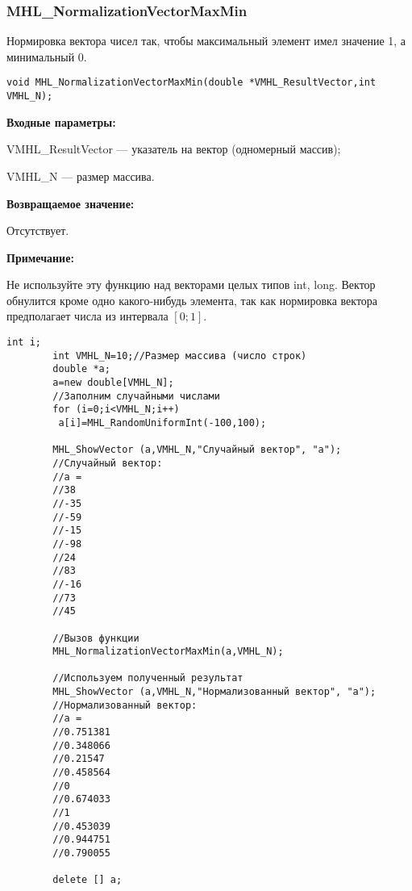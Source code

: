 \documentclass[a4paper,12pt]{article}
\begin{document}
\subsubsection{MHL\_NormalizationVectorMaxMin}\label{MHL_NormalizationVectorMaxMin}

Нормировка вектора чисел так, чтобы максимальный элемент имел значение 1, а минимальный 0.


\begin{lstlisting}[label=code_syntax_MHL_NormalizationVectorMaxMin,caption=Синтаксис]
void MHL_NormalizationVectorMaxMin(double *VMHL_ResultVector,int VMHL_N);
\end{lstlisting}

\textbf{Входные параметры:}

 VMHL\_ResultVector --- указатель на вектор (одномерный массив);
 
 VMHL\_N --- размер массива.

\textbf{Возвращаемое значение:} 
 
Отсутствует.

\textbf{Примечание:} 

Не используйте эту функцию над векторами целых типов int, long. Вектор обнулится кроме одно какого-нибудь элемента, так как нормировка вектора предполагает числа из интервала $[0;1]$.


\begin{lstlisting}[label=code_use_MHL_NormalizationVectorMaxMin,caption=Пример использования]
        int i;
        int VMHL_N=10;//Размер массива (число строк)
        double *a;
        a=new double[VMHL_N];
        //Заполним случайными числами
        for (i=0;i<VMHL_N;i++)
         a[i]=MHL_RandomUniformInt(-100,100);

        MHL_ShowVector (a,VMHL_N,"Случайный вектор", "a");
        //Случайный вектор:
        //a =
        //38
        //-35
        //-59
        //-15
        //-98
        //24
        //83
        //-16
        //73
        //45

        //Вызов функции
        MHL_NormalizationVectorMaxMin(a,VMHL_N);

        //Используем полученный результат
        MHL_ShowVector (a,VMHL_N,"Нормализованный вектор", "a");
        //Нормализованный вектор:
        //a =
        //0.751381
        //0.348066
        //0.21547
        //0.458564
        //0
        //0.674033
        //1
        //0.453039
        //0.944751
        //0.790055

        delete [] a;
\end{lstlisting}
\end{document}
